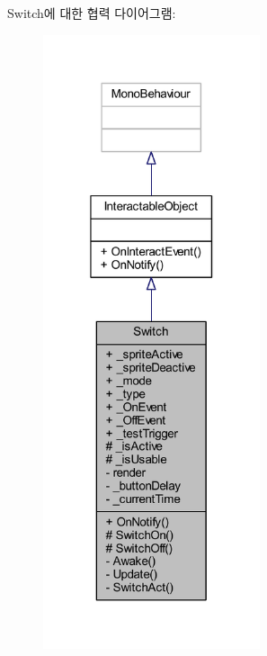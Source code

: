 Switch에 대한 협력 다이어그램\+:
\nopagebreak
\begin{figure}[H]
\begin{center}
\leavevmode
\includegraphics[width=181pt]{d6/d28/class_switch__coll__graph}
\end{center}
\end{figure}
